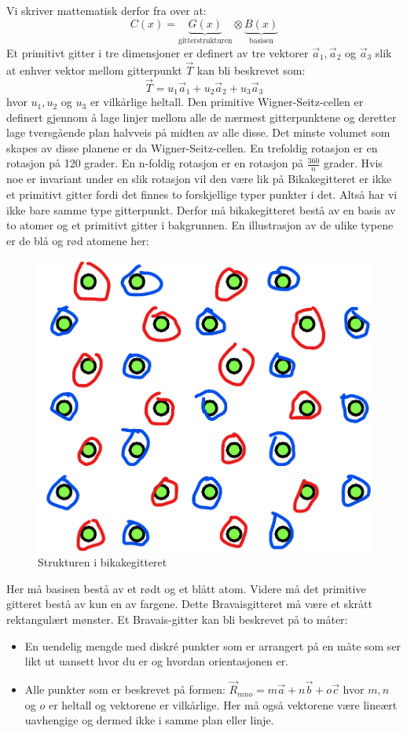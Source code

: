 \documentclass{article}
\begin{document}
Vi skriver mattematisk derfor fra over at:
\begin{equation}
    C(x) = \underbrace{G(x)}_{\text{gitterstrukturen}}\otimes \underbrace{B(x)}_{\text{basisen}}
\end{equation}
Et primitivt gitter i tre dimensjoner er definert av tre vektorer $\vec{a}_1, \vec{a}_2$ og $\vec{a}_3$ slik at enhver vektor mellom gitterpunkt $\Vec{T}$ kan bli beskrevet som:
\begin{equation}
    \vec{T} = u_1 \vec{a}_1+ u_2 \Vec{a}_2 +  u_3 \Vec{a}_3
\end{equation}
hvor $u_1, u_2$ og $u_3$ er vilkårlige heltall. 
Den primitive Wigner-Seitz-cellen er definert gjennom å lage linjer mellom alle de nærmest gitterpunktene og deretter lage tversgående plan halvveis på midten av alle disse. Det minste volumet som skapes av disse planene er da Wigner-Seitz-cellen.
En trefoldig rotasjon er en rotasjon på 120 grader. En n-foldig rotasjon er en rotasjon på $\frac{360}{n}$ grader. Hvis noe er invariant under en slik rotasjon vil den være lik på 
Bikakegitteret er ikke et primitivt gitter fordi det finnes to forskjellige typer punkter i det. Altså har vi ikke bare samme type gitterpunkt. Derfor må bikakegitteret bestå av en basis av to atomer og et primitivt gitter i bakgrunnen. En illustrasjon av de ulike typene er de blå og rød atomene her:
\begin{figure}[H]
    \centering
    \includegraphics[width=0.2\linewidth]{bilder_lf/bikake_gitterstruktur.png}
    \caption{Strukturen i bikakegitteret}
    \label{fig:bikake_gitterstruktur}
\end{figure}
Her må basisen bestå av et rødt og et blått atom. Videre må det primitive gitteret bestå av kun en av fargene. Dette Bravaisgitteret må være et skrått rektangulært mønster.
Et Bravais-gitter kan bli beskrevet på to måter:
\begin{itemize}
    \item En uendelig mengde med diskré punkter som er arrangert på en måte som ser likt ut uansett hvor du er og hvordan orientasjonen er.
    \item Alle punkter som er beskrevet på formen: $\vec{R}_{mno} = m \vec{a} + n\vec{b} + o\vec{c}$ hvor $m, n$ og $o$ er heltall og vektorene er vilkårlige. Her må også vektorene være lineært uavhengige og dermed ikke i samme plan eller linje. 
\end{itemize}
\end{document}
